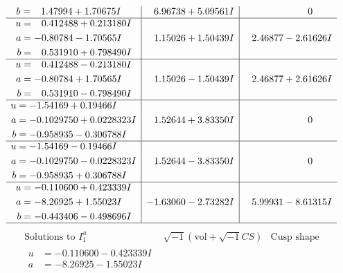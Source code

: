 \documentclass[1p]{elsarticle_modified}
\theoremstyle{definition}
\newcommand{\I}{\sqrt{-1}}
\begin{document}
$$\begin{array}{c|c|c}
\begin{aligned}
b &= \phantom{-}1.47994 + 1.70675 I\end{aligned}
 & \phantom{-}6.96738 + 5.09561 I & \phantom{-0.000000 } 0 \\ \hline\begin{aligned}
u &= \phantom{-}0.412488 + 0.213180 I \\
a &= -0.80784 - 1.70565 I \\
b &= \phantom{-}0.531910 + 0.798490 I\end{aligned}
 & \phantom{-}1.15026 + 1.50439 I & \phantom{-}2.46877 - 2.61626 I \\ \hline\begin{aligned}
u &= \phantom{-}0.412488 - 0.213180 I \\
a &= -0.80784 + 1.70565 I \\
b &= \phantom{-}0.531910 - 0.798490 I\end{aligned}
 & \phantom{-}1.15026 - 1.50439 I & \phantom{-}2.46877 + 2.61626 I \\ \hline\begin{aligned}
u &= -1.54169 + 0.19466 I \\
a &= -0.1029750 + 0.0228323 I \\
b &= -0.958935 - 0.306788 I\end{aligned}
 & \phantom{-}1.52644 + 3.83350 I & \phantom{-0.000000 } 0 \\ \hline\begin{aligned}
u &= -1.54169 - 0.19466 I \\
a &= -0.1029750 - 0.0228323 I \\
b &= -0.958935 + 0.306788 I\end{aligned}
 & \phantom{-}1.52644 - 3.83350 I & \phantom{-0.000000 } 0 \\ \hline\begin{aligned}
u &= -0.110600 + 0.423339 I \\
a &= -8.26925 + 1.55023 I \\
b &= -0.443406 - 0.498696 I\end{aligned}
 & -1.63060 - 2.73282 I & \phantom{-}5.99931 - 8.61315 I\\
 \hline 
 \end{array}$$\newpage$$\begin{array}{c|c|c}  
\text{Solutions to }I^u_{1}& \I (\text{vol} + \sqrt{-1}CS) & \text{Cusp shape}\\
 \hline 
\begin{aligned}
u &= -0.110600 - 0.423339 I \\
a &= -8.26925 - 1.55023 I \\

\end{aligned}
\end{array}$$
\end{document}
